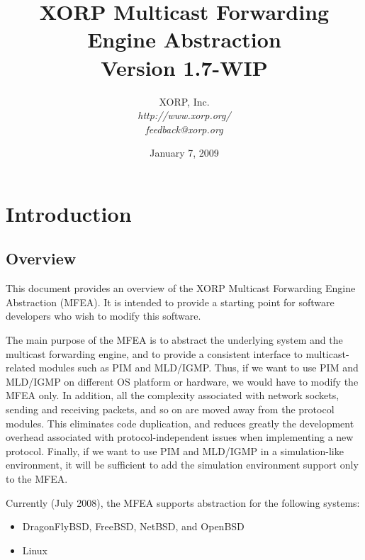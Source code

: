 \documentclass[11pt]{article}
\begin{document}
\title{XORP Multicast Forwarding Engine Abstraction \\
\vspace{1ex}
Version 1.7-WIP}
\author{ XORP, Inc.					\\
         {\it http://www.xorp.org/}			\\
	 {\it feedback@xorp.org}
}
\date{January 7, 2009}

\maketitle


\section{Introduction}


\subsection{Overview}

This document provides an overview of the XORP Multicast Forwarding
Engine Abstraction (MFEA). It is intended to provide a starting point
for software developers who wish to modify this software.

The main purpose of the MFEA is to abstract the underlying system and
the multicast forwarding engine, and to provide a consistent interface
to multicast-related modules such as PIM and MLD/IGMP. Thus, if we want
to use PIM and MLD/IGMP on different OS platform or hardware, we
would have to modify the MFEA only. In addition, all the
complexity associated with network sockets, sending and receiving
packets, and so on are moved away from the protocol modules.
This eliminates code duplication, and reduces greatly the
development overhead associated with protocol-independent
issues when implementing a new protocol. Finally, if we want to use
PIM and MLD/IGMP in a simulation-like environment, it will be sufficient
to add the simulation environment support only to the MFEA.

Currently (July 2008), the MFEA supports abstraction for
the following systems:

\begin{itemize}
  \item DragonFlyBSD, FreeBSD, NetBSD, and OpenBSD
  \item Linux
\end{itemize}
\end{document}
